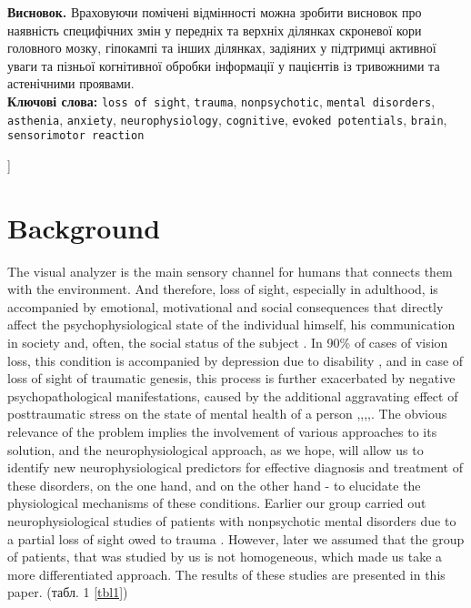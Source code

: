 \documentclass[twocolumn]{article}
\begin{document}
\begin{@twocolumnfalse}
\textbf{Висновок. }Враховуючи помічені відмінності можна зробити висновок про наявність специфічних змін у передніх та верхніх ділянках скроневої кори головного мозку, гіпокампі та інших ділянках, задіяних у підтримці активної уваги та пізньої когнітивної обробки інформації у пацієнтів із тривожними та астенічними проявами. \vspace{1ex}\\
{\textbf{Ключові слова:}} \texttt{loss of sight}, 
\texttt{trauma}, 
\texttt{nonpsychotic}, 
\texttt{mental disorders}, 
\texttt{asthenia}, 
\texttt{anxiety}, 
\texttt{neurophysiology}, 
\texttt{cognitive}, 
\texttt{evoked potentials}, 
\texttt{brain}, 
\texttt{sensorimotor reaction}\vspace{5ex}
\end{@twocolumnfalse}]
\section {Background}
\par The visual analyzer is the main sensory channel for humans that connects them with the environment. And therefore, loss of sight, especially in adulthood, is accompanied by emotional, motivational and social consequences that directly affect the psychophysiological state of the individual himself, his communication in society and, often, the social status of the subject \cite{bib1}. In 90\% of cases of vision loss, this condition is accompanied by depression due to disability \cite{bib2}, and in case of loss of sight of traumatic genesis, this process is further exacerbated by negative psychopathological manifestations, caused by the additional aggravating effect of posttraumatic stress on the state of mental health of a person \cite{bib3},\cite{bib4},\cite{bib5},\cite{bib6},\cite{bib7}. The obvious relevance of the problem implies the involvement of various approaches to its solution, and the neurophysiological approach, as we hope, will allow us to identify new neurophysiological predictors for effective diagnosis and treatment of these disorders, on the one hand, and on the other hand - to elucidate the physiological mechanisms of these conditions. Earlier our group carried out neurophysiological studies of patients with nonpsychotic mental disorders due to a partial loss of sight owed to trauma \cite{bib8}. However, later we assumed that the group of patients, that was studied by us is not homogeneous, which made us take a more differentiated approach. The results of these studies are presented in this paper. (табл. 1 \ref{tbl1})
\end{document}
